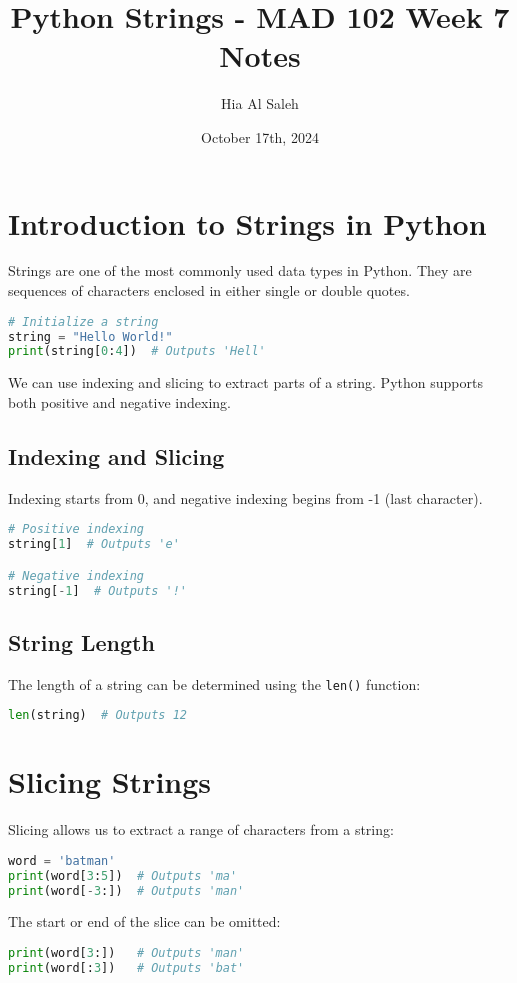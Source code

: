 \documentclass{article}
\title{Python Strings - MAD 102 Week 7 Notes}
\author{Hia Al Saleh}
\date{October 17th, 2024}
\begin{document}
\maketitle
\tableofcontents
\newpage 

\section{Introduction to Strings in Python}
Strings are one of the most commonly used data types in Python. They are sequences of characters enclosed in either single or double quotes.

\begin{lstlisting}[language=Python]
# Initialize a string
string = "Hello World!"
print(string[0:4])  # Outputs 'Hell'
\end{lstlisting}

We can use indexing and slicing to extract parts of a string. Python supports both positive and negative indexing.

\subsection{Indexing and Slicing}
Indexing starts from 0, and negative indexing begins from -1 (last character).
\begin{lstlisting}[language=Python]
# Positive indexing
string[1]  # Outputs 'e'

# Negative indexing
string[-1]  # Outputs '!'
\end{lstlisting}

\subsection{String Length}
The length of a string can be determined using the \texttt{len()} function:
\begin{lstlisting}[language=Python]
len(string)  # Outputs 12
\end{lstlisting}

\section{Slicing Strings}
Slicing allows us to extract a range of characters from a string:
\begin{lstlisting}[language=Python]
word = 'batman'
print(word[3:5])  # Outputs 'ma'
print(word[-3:])  # Outputs 'man'
\end{lstlisting}

The start or end of the slice can be omitted:
\begin{lstlisting}[language=Python]
print(word[3:])   # Outputs 'man'
print(word[:3])   # Outputs 'bat'
\end{lstlisting}
\end{document}
